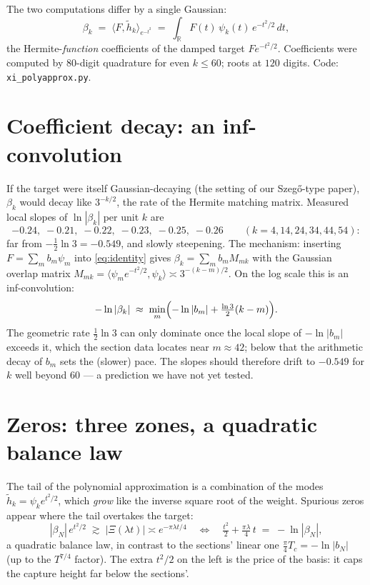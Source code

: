 \documentclass[11pt]{article}
\theoremstyle{remark}
\newcommand{\R}{\mathbb{R}}
\begin{document}
The two computations differ by a single Gaussian:
\begin{equation}
\beta_k \;=\; \langle F, \tilde h_k \rangle_{e^{-t^2}}
\;=\; \int_\R F(t)\, \psi_k(t)\, e^{-t^2/2}\, dt,
\label{eq:identity}
\end{equation}
the Hermite-\emph{function} coefficients of the damped target $F e^{-t^2/2}$. Coefficients were computed by $80$-digit quadrature for even $k \le 60$; roots at $120$ digits. Code: \texttt{xi\_polyapprox.py}.

\section{Coefficient decay: an inf-convolution}

If the target were itself Gaussian-decaying (the setting of our Szeg\H{o}-type paper), $\beta_k$ would decay like $3^{-k/2}$, the rate of the Hermite matching matrix. Measured local slopes of $\ln|\beta_k|$ per unit $k$ are
\[
-0.24,\; -0.21,\; -0.22,\; -0.23,\; -0.25,\; -0.26
\qquad (k = 4, 14, 24, 34, 44, 54):
\]
far from $-\tfrac12\ln 3 = -0.549$, and slowly steepening. The mechanism: inserting $F = \sum_m b_m \psi_m$ into \eqref{eq:identity} gives $\beta_k = \sum_m b_m M_{mk}$ with the Gaussian overlap matrix $M_{mk} = \langle \psi_m e^{-t^2/2}, \psi_k\rangle \asymp 3^{-(k-m)/2}$. On the log scale this is an inf-convolution:
\[
-\ln|\beta_k| \;\approx\; \min_m \Bigl( -\ln|b_m| + \tfrac{\ln 3}{2}(k - m) \Bigr).
\]
The geometric rate $\tfrac12 \ln 3$ can only dominate once the local slope of $-\ln|b_m|$ exceeds it, which the section data locates near $m \approx 42$; below that the arithmetic decay of $b_m$ sets the (slower) pace. The slopes should therefore drift to $-0.549$ for $k$ well beyond $60$ --- a prediction we have not yet tested.

\section{Zeros: three zones, a quadratic balance law}

The tail of the polynomial approximation is a combination of the modes $\tilde h_k = \psi_k e^{t^2/2}$, which \emph{grow} like the inverse square root of the weight. Spurious zeros appear where the tail overtakes the target:
\begin{equation}
|\beta_N|\, e^{t^2/2} \;\gtrsim\; |\Xi(\lambda t)| \asymp e^{-\pi\lambda t/4}
\quad\Longleftrightarrow\quad
\tfrac{t^2}{2} + \tfrac{\pi\lambda}{4}\,t \;=\; -\ln|\beta_N|,
\label{eq:balance}
\end{equation}
a quadratic balance law, in contrast to the sections' linear one $\tfrac{\pi}{4}T_c = -\ln|b_N|$ (up to the $T^{7/4}$ factor). The extra $t^2/2$ on the left is the price of the basis: it caps the capture height far below the sections'.
\end{document}
